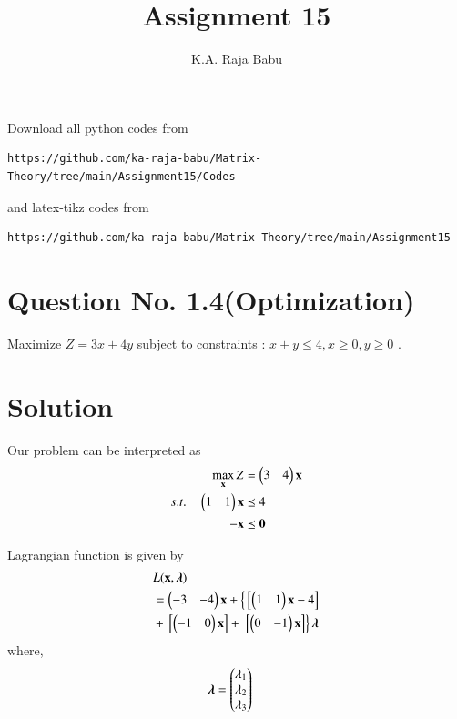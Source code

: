 \documentclass[journal,12pt,twocolumn]{IEEEtran}
\begin{document}
\makeatother
\let\StandardTheFigure\thefigure
\let\vec\mathbf
\renewcommand{\thefigure}{\theproblem}
\def\putbox#1#2#3{\makebox[0in][l]{\makebox[#1][l]{}\raisebox{\baselineskip}[0in][0in]{\raisebox{#2}[0in][0in]{#3}}}}
     \def\rightbox#1{\makebox[0in][r]{#1}}
     \def\centbox#1{\makebox[0in]{#1}}
     \def\topbox#1{\raisebox{-\baselineskip}[0in][0in]{#1}}
     \def\midbox#1{\raisebox{-0.5\baselineskip}[0in][0in]{#1}}
\vspace{3cm}
\title{Assignment 15}
\author{K.A. Raja Babu}
\maketitle
\newpage
\bigskip
\renewcommand{\thefigure}{\theenumi}
\renewcommand{\thetable}{\theenumi}
Download all python codes from 
\begin{lstlisting}
https://github.com/ka-raja-babu/Matrix-Theory/tree/main/Assignment15/Codes
\end{lstlisting}
%
and latex-tikz codes from 
%
\begin{lstlisting}
https://github.com/ka-raja-babu/Matrix-Theory/tree/main/Assignment15
\end{lstlisting}
%
\section{Question No. 1.4(Optimization)}

Maximize $Z=3x+4y$ subject to constraints : $x+y \leq 4,x \geq 0,y \geq 0$ .

\section{Solution}

Our problem can be interpreted as
\begin{align}
        \max_{\vec{x}} Z &= \myvec{3 & 4}\vec{x}\\
        s.t. \quad 
        \myvec{1 & 1 }\vec{x} &\preceq 4 \\
        -\vec{x} &\preceq \vec{0}
\end{align}

Lagrangian function is given by
\begin{equation}
\begin{aligned}
    &L(\vec{x},\boldsymbol{\lambda}) \\ &= \myvec{-3 & -4}\vec{x}+\lcbrak{\sbrak{\myvec{1 & 1}\vec{x}-4}} \\ &+\sbrak{\myvec{-1 & 0}\vec{x}} +\rcbrak{\sbrak{\myvec{0 & -1}\vec{x}}}\boldsymbol{\lambda}
\end{aligned}
\end{equation}
where,
\begin{align}
    \boldsymbol{\lambda} &= \begin{pmatrix}\lambda_1 \\ \lambda_2 \\ \lambda_3 \end{pmatrix}
\end{align}
\end{document}
